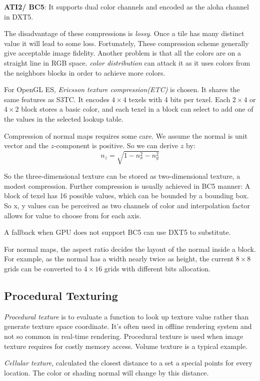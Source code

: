 \documentclass[10pt, a4paper]{article}
\begin{document}
    \quad \textbf{ATI2/ BC5}: It supports dual color channels and encoded as the aloha channel in DXT5. 

    The disadvantage of these compressions is \emph{lossy}. Once a tile has many distinct value it will lead to some loss. Fortunately, These compression scheme generally give acceptable image fidelity. Another problem is that all the colors are on a straight line in RGB space. \emph{color distribution} can attack it as it uses colors from the neighbors blocks in order to achieve more colors. 

    For OpenGL ES, \emph{Ericsson texture compression(ETC)} is chosen. It shares the same features as S3TC. It encodes $4 \times 4$ texels with 4 bits per texel. Each $2 \times 4$ or $4 \times 2$ block stores a basic color, and each texel in a block can select to add one of the values in the selected lookup table. 

    Compression of normal maps requires some care. We assume the normal is unit vector and the $z$-component is positive. So we can derive $z$ by: 
    $$n_z = \sqrt{1 - n_x^2 - n_y^2}$$
    
    So the three-dimensional texture can be stored as two-dimensional texture, a modest compression. Further compression is usually achieved in BC5 manner: A block of texel has 16 possible values, which can be bounded by a bounding box. So x, y values can be perceived as two channels of color and interpolation factor allows for value to choose from for each axis. 

    A fallback when GPU does not support BC5 can use DXT5 to substitute. 

    For normal maps, the aspect ratio decides the layout of the normal inside a block. For example, as the normal has a width nearly twice as height, the current $8 \times 8$ grids can be converted to $4 \times 16$ grids with different bits allocation. 

\subsection{Procedural Texturing}
\emph{Procedural texture} is to evaluate a function to look up texture value rather than generate texture space coordinate. It's often used in offline rendering system and not so common in real-time rendering. Procedural texture is used when image texture requires for costly memory access. Volume texture is a typical example. 

\emph{Cellular texture}, calculated the closest distance to a set a special points for every location. The color or shading normal will change by this distance. 
\end{document}
